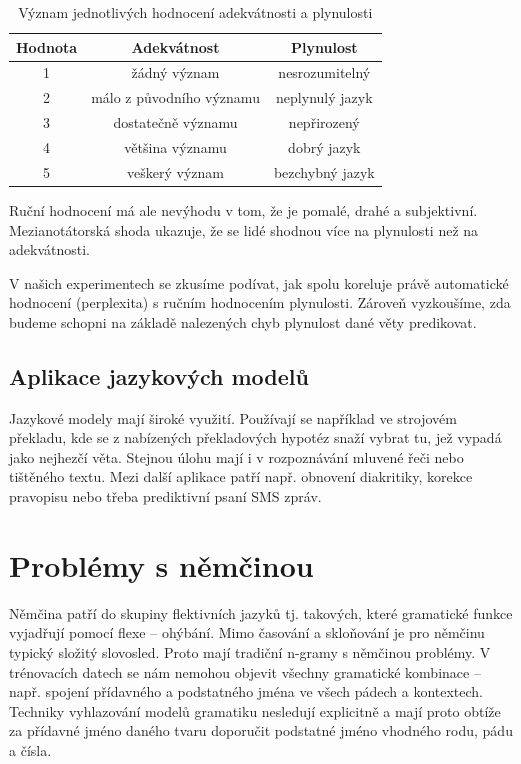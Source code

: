 \documentclass[12pt,a4paper]{report}
\begin{document}
\begin{table}[!htbp]
\begin{center}\begin{tabular}{|c|c|c|}
\hline
\textbf{Hodnota} & \textbf{Adekvátnost} & \textbf{Plynulost}\\
\hline
1 & žádný význam & nesrozumitelný \\
\hline
2 & málo z původního významu & neplynulý jazyk \\
\hline
3 & dostatečně významu & nepřirozený \\
\hline
4 & většina významu & dobrý jazyk \\
\hline
5 & veškerý význam & bezchybný jazyk \\
\hline
\end{tabular}
\caption{Význam jednotlivých hodnocení adekvátnosti a plynulosti}\label{tb:vyznamflad}
\end{center}\end{table}

Ruční hodnocení má ale nevýhodu v tom, že je pomalé, drahé a subjektivní. Mezianotátorská shoda ukazuje, že se lidé shodnou více na plynulosti než na adekvátnosti.

V našich experimentech se zkusíme podívat, jak spolu koreluje právě automatické hodnocení (perplexita) s ručním hodnocením plynulosti. Zároveň vyzkoušíme, zda budeme schopni na základě nalezených chyb plynulost dané věty predikovat.


\section{Aplikace jazykových modelů}
Jazykové modely mají široké využití. Používají se například ve strojovém překladu, kde se z nabízených překladových hypotéz snaží vybrat tu, jež vypadá jako nejhezčí věta. Stejnou úlohu mají i v rozpoznávání mluvené řeči nebo tištěného textu. Mezi další aplikace patří např. obnovení diakritiky, korekce pravopisu nebo třeba prediktivní psaní SMS zpráv.

\chapter{Problémy s němčinou}
Němčina patří do skupiny flektivních jazyků tj. takových, které gramatické funkce vyjadřují pomocí flexe -- ohýbání. Mimo časování a skloňování je pro němčinu typický složitý slovosled. Proto mají tradiční n-gramy s němčinou problémy. V trénovacích datech se nám nemohou objevit všechny gramatické kombinace -- např. spojení přídavného a podstatného jména ve všech pádech a kontextech. Techniky vyhlazování modelů gramatiku nesledují explicitně a mají proto obtíže za přídavné jméno daného tvaru doporučit podstatné jméno vhodného rodu, pádu a čísla.
\end{document}
